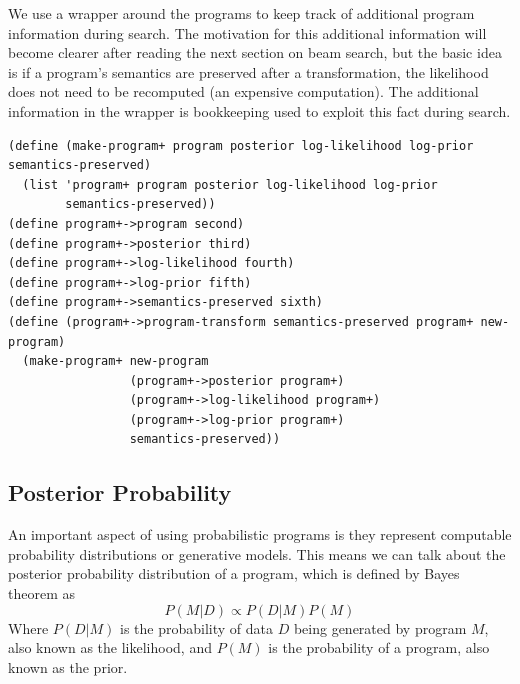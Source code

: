 \documentclass[a4paper,10pt]{article}
\begin{document}
We use a wrapper around the programs to keep track of additional program information during search.  The motivation for this additional information will become clearer after reading the next section on beam search, but the basic idea is if a program's semantics are preserved after a transformation, the likelihood does not need to be recomputed (an expensive computation). The additional information in the wrapper is bookkeeping used to exploit this fact during search.  
\begin{lstlisting}[frame=trBL]
(define (make-program+ program posterior log-likelihood log-prior semantics-preserved)
  (list 'program+ program posterior log-likelihood log-prior 
        semantics-preserved))
(define program+->program second)
(define program+->posterior third)
(define program+->log-likelihood fourth)
(define program+->log-prior fifth)
(define program+->semantics-preserved sixth)
(define (program+->program-transform semantics-preserved program+ new-program)
  (make-program+ new-program 
                 (program+->posterior program+) 
                 (program+->log-likelihood program+) 
                 (program+->log-prior program+) 
                 semantics-preserved))
\end{lstlisting}


\subsection{Posterior Probability}
An important aspect of using probabilistic programs is they represent computable probability distributions or generative models.  This means we can talk about the posterior probability distribution of a program, which is defined by Bayes theorem as 
\begin{equation}P(M|D)\propto P(D|M)P(M)\end{equation}
Where $P(D|M)$ is the probability of data $D$ being generated by program $M$, also known as the likelihood, and $P(M)$ is the probability of a program, also known as the prior.
\end{document}
